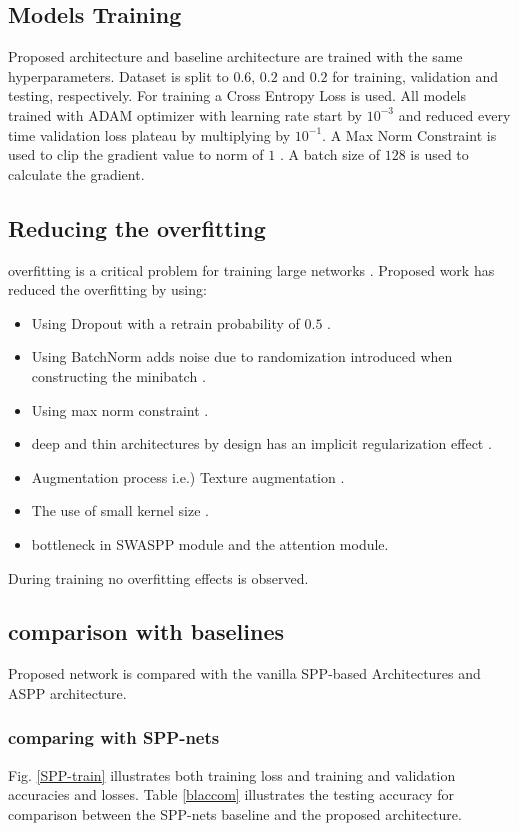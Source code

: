 \subsection{Models Training}
Proposed architecture and baseline architecture are trained with the same hyperparameters. Dataset is split to $0.6$, $0.2$ and $0.2$ for training, validation and testing, respectively. For training a Cross Entropy Loss is used. All models trained with ADAM \cite{kingma2014adam} optimizer with learning rate start by $10^{-3}$ and reduced every time validation loss plateau by multiplying by $10^{-1}$. A Max Norm Constraint is used to clip the gradient value to norm of $1$ \cite{krizhevsky2012imagenet}. A batch size of $128$ is used to calculate the gradient.
\subsection{Reducing the overfitting}
overfitting is a critical problem for training large networks \cite{krizhevsky2012imagenet}. Proposed work has reduced the overfitting by using:
\begin{itemize}
\item Using Dropout with a retrain probability of $0.5$ \cite{srivastava2014dropout}.
\item Using BatchNorm adds noise due to randomization introduced when constructing the minibatch \cite{ioffe2015batch}.
\item Using max norm constraint \cite{krizhevsky2012imagenet}.
\item deep and thin architectures by design has an implicit regularization effect \cite{he2016deep}. 
\item Augmentation process i.e.) Texture augmentation \cite{krizhevsky2012imagenet}. 
\item The use of small kernel size \cite{simonyan2014very}.
\item bottleneck in SWASPP module and the attention module.
\end{itemize}
During training no overfitting effects is observed.
\subsection{comparison with baselines}
Proposed network is compared with the vanilla SPP-based Architectures and ASPP architecture.
\subsubsection{comparing with SPP-nets}
Fig. \ref{SPP-train} illustrates both training loss and training and validation accuracies and losses. Table \ref{blaccom} illustrates the testing accuracy for comparison between the SPP-nets baseline and the proposed architecture.


